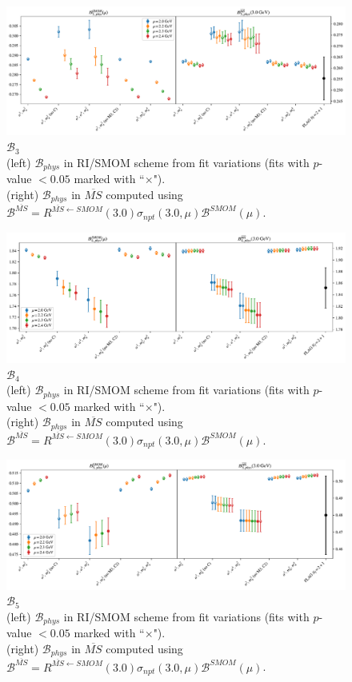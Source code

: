 \documentclass[12pt]{extarticle}
\begin{document}
\begin{figure}
\centering
\includegraphics[page=1, width=1.1\textwidth]{SSmPP/SUSY/fit_summary_bag.pdf}
\caption{$\mathcal{B}_{3}$\\(left) $\mathcal{B}_{phys}$ in RI/SMOM scheme from fit variations (fits with $p$-value $<0.05$ marked with ``$\times$"). \\(right) $\mathcal{B}_{phys}$ in $\overline{MS}$ computed using $\mathcal{B}^{\overline{MS}} = R^{\overline{MS}\leftarrow SMOM}(3.0)\sigma_{npt}(3.0,\mu) \mathcal{B}^{SMOM}(\mu)$.}
\end{figure}
\clearpage
\begin{figure}
\centering
\includegraphics[page=1, width=1.1\textwidth]{SSpPP/SUSY/fit_summary_bag.pdf}
\caption{$\mathcal{B}_{4}$\\(left) $\mathcal{B}_{phys}$ in RI/SMOM scheme from fit variations (fits with $p$-value $<0.05$ marked with ``$\times$"). \\(right) $\mathcal{B}_{phys}$ in $\overline{MS}$ computed using $\mathcal{B}^{\overline{MS}} = R^{\overline{MS}\leftarrow SMOM}(3.0)\sigma_{npt}(3.0,\mu) \mathcal{B}^{SMOM}(\mu)$.}
\end{figure}
\clearpage
\begin{figure}
\centering
\includegraphics[page=1, width=1.1\textwidth]{TT/SUSY/fit_summary_bag.pdf}
\caption{$\mathcal{B}_{5}$\\(left) $\mathcal{B}_{phys}$ in RI/SMOM scheme from fit variations (fits with $p$-value $<0.05$ marked with ``$\times$"). \\(right) $\mathcal{B}_{phys}$ in $\overline{MS}$ computed using $\mathcal{B}^{\overline{MS}} = R^{\overline{MS}\leftarrow SMOM}(3.0)\sigma_{npt}(3.0,\mu) \mathcal{B}^{SMOM}(\mu)$.}
\end{figure}
\clearpage
\end{document}
